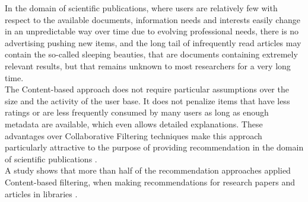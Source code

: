 \documentclass[\myFontSize,oneside,english,hidelinks,a4paper]{article}
\begin{document}
%
%
%
In the domain of scientific publications, where users are relatively few with respect to the available documents, information needs and interests easily change in an unpredictable way over time due to evolving professional needs, there is no advertising pushing new items, and the long tail of infrequently read articles may contain the so-called sleeping beauties, that are documents containing extremely relevant results, but that remains unknown to most researchers for a very long time. \\
The Content-based approach does not require particular assumptions over the size and the activity of the user base. It does not penalize items that have less ratings or are less frequently consumed by many users as long as enough metadata are available, which even allows detailed explanations. These advantages over Collaborative Filtering techniques make this approach particularly attractive to the purpose of providing recommendation in the domain of scientific publications \cite{De_Nart201484}. \\
%
A study shows that more than half of the recommendation approaches applied Content-based filtering, when making recommendations for research papers and articles in libraries \cite{Beel2016305}. \\
%





\end{document}

